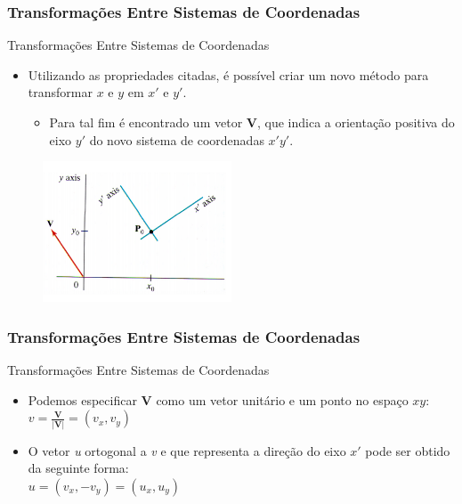 \documentclass{beamer}
\begin{document}
\begin{frame}
\frametitle{Transformações Entre Sistemas de Coordenadas}

	\begin{block}{Transformações Entre Sistemas de Coordenadas}
		\begin{itemize}
			\item Utilizando as propriedades citadas, é possível criar um novo método para transformar $x$ e $y$ em $x'$ e $y'$.
			\begin{itemize}
				\item Para tal fim é encontrado um vetor \textbf{V}, que indica a orientação positiva do eixo $y'$ do novo sistema de coordenadas $x'y'$.
			\end{itemize}						
		\end{itemize}
	\end{block}
	
	\begin{figure}[!h]
		\begin{center}
			\includegraphics[width=0.5\textwidth]{Figures/novoCoord}
		\end{center}
	\end{figure}
\end{frame}

\begin{frame}
\frametitle{Transformações Entre Sistemas de Coordenadas}

	\begin{block}{Transformações Entre Sistemas de Coordenadas}
		\begin{itemize}
			\item Podemos especificar \textbf{V} como um vetor unitário e um ponto no espaço $xy$:\\
			$ \textit{v} = \frac{\textbf{V}}{|\textbf{V}|} = (v_x,v_y)$
			\item O vetor \textit{u} ortogonal a \textit{v} e que representa a direção do eixo $x'$ pode ser obtido da seguinte forma:\\
			$ \textit{u} = (v_x, -v_y) = (u_x,u_y) $
		\end{itemize}
	\end{block}

\end{frame}
\end{document}
